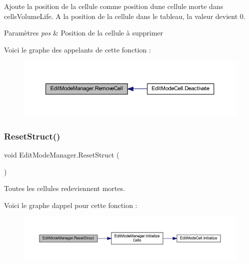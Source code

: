 Ajoute la position de la cellule comme position d\textquotesingle{}une cellule morte dans cells\+Volume\+Life. A la position de la cellule dans le tableau, la valeur devient 0. 


\begin{DoxyParams}{Paramètres}
{\em pos} & Position de la cellule à supprimer\\
\hline
\end{DoxyParams}
Voici le graphe des appelants de cette fonction \+:
\nopagebreak
\begin{figure}[H]
\begin{center}
\leavevmode
\includegraphics[width=350pt]{class_edit_mode_manager_a8a8c1a3a9558fbbcfa7c15d8ce48a264_icgraph}
\end{center}
\end{figure}
\mbox{\label{class_edit_mode_manager_afc8be75da1a5042fcf78b0e9bf1e2108}} 
\subsubsection{\texorpdfstring{Reset\+Struct()}{ResetStruct()}}
{\footnotesize\ttfamily void Edit\+Mode\+Manager.\+Reset\+Struct (\begin{DoxyParamCaption}{ }\end{DoxyParamCaption})\hspace{0.3cm}{\ttfamily [inline]}}



Toutes les cellules redeviennent mortes. 

Voici le graphe d\textquotesingle{}appel pour cette fonction \+:
\nopagebreak
\begin{figure}[H]
\begin{center}
\leavevmode
\includegraphics[width=350pt]{class_edit_mode_manager_afc8be75da1a5042fcf78b0e9bf1e2108_cgraph}
\end{center}
\end{figure}
\mbox{\label{class_edit_mode_manager_acf80baac30f6611bcb1bf97b61ffc1ca}} 
